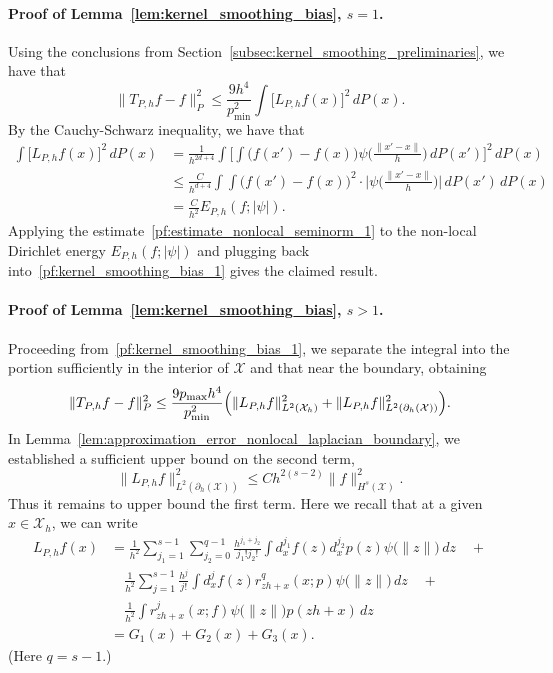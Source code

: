 \documentclass[aos]{imsart}
\theoremstyle{plain}
\theoremstyle{definition}
\theoremstyle{remark}
\newcommand{\mc}[1]{\mathcal{#1}}
\newcommand{\1}{\mathbf{1}}
\begin{document}
\paragraph{Proof of Lemma~\ref{lem:kernel_smoothing_bias}, $s = 1$.}
Using the conclusions from Section~\ref{subsec:kernel_smoothing_preliminaries}, we have that
\begin{equation}
\label{pf:kernel_smoothing_bias_1}
\|T_{P,h}f - f\|_P^2 \leq \frac{9h^4}{p_{\min}^2} \int \bigl[L_{P,h}f(x)\bigr]^2 \,dP(x).
\end{equation}
By the Cauchy-Schwarz inequality, we have that
\begin{align*}
\int \bigl[L_{P,h}f(x)\bigr]^2 \,dP(x) & = \frac{1}{h^{2d + 4}}\int \biggl[\int \bigl(f(x') - f(x)\bigr)\psi\biggl(\frac{\|x' - x\|}{h}\biggr) \,dP(x')\biggr]^2 \,dP(x) \\
& \leq \frac{C}{h^{d + 4}} \int \int \bigl(f(x') - f(x)\bigr)^2 \cdot \biggl|\psi\biggl(\frac{\|x' - x\|}{h}\biggr)\biggr| \,dP(x') \,dP(x) \\
& = \frac{C}{h^{2}} E_{P,h}(f;|\psi|).
\end{align*}
Applying the estimate~\eqref{pf:estimate_nonlocal_seminorm_1} to the non-local Dirichlet energy ${E}_{P,h}(f;|\psi|)$ and plugging back into~\eqref{pf:kernel_smoothing_bias_1} gives the claimed result.

\paragraph{Proof of Lemma~\ref{lem:kernel_smoothing_bias}, $s > 1$.}
Proceeding from~\eqref{pf:kernel_smoothing_bias_1}, we separate the integral into the portion sufficiently in the interior of $\mc{X}$ and that near the boundary, obtaining
\begin{equation}
\label{pf:kernel_smoothing_bias_2}
\|T_{P,h}f - f\|_P^2 \leq\frac{9p_{\max}h^4}{p_{\min}^2}\Bigl(\|L_{P,h}f\|_{L^2(\mc{X}_h)}^2 + \|L_{P,h}f\|_{L^2(\partial_{h}(\mc{X}))}^2\Bigr).
\end{equation}
In Lemma~\ref{lem:approximation_error_nonlocal_laplacian_boundary}, we established a sufficient upper bound on the second term,
\begin{equation*}
\|L_{P,h}f\|_{L^2(\partial_{h}(\mc{X}))}^2 \leq Ch^{2(s - 2)} \|f\|_{H^s(\mc{X})}^2.
\end{equation*}
Thus it remains to upper bound the first term. Here we recall that at a given $x \in \mc{X}_h$, we can write
\begin{align*}
L_{P,h}f(x) & = \frac{1}{h^{2}}\sum_{j_1 = 1}^{s - 1} \sum_{j_2 = 0}^{q - 1}\frac{h^{j_1 + j_2}}{j_1!j_2!}  \int d_x^{j_1}f(z) d_x^{j_2}p(z) \psi\bigl(\|z\|\bigr) \,dz \quad + \\
& \quad \frac{1}{h^{2}} \sum_{j = 1}^{s - 1} \frac{h^j}{j!} \int d_x^jf(z)  r_{zh + x}^{q}(x;p) \psi\bigl(\|z\|\bigr) \,dz \quad  + \\
& \quad \frac{1}{h^{2}} \int r_{zh + x}^j(x;f) \psi\bigl(\|z\|\bigr) p(zh + x)\,dz \\
& = G_1(x) + G_2(x) + G_3(x).
\end{align*}
(Here $q = s - 1$.) 
\end{document}
